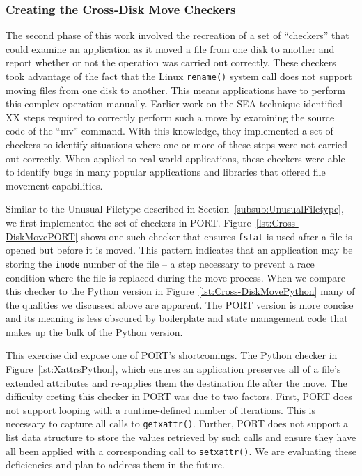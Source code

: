 \subsubsection{Creating the Cross-Disk Move Checkers}

The second phase of this work involved the recreation of a set of
``checkers'' that could examine an application as it moved a file from one
disk to another and report whether or not the operation was carried
out correctly.  These checkers took advantage of the fact that the Linux
{\tt rename()} system call does not support moving files from one disk to
another.  This means applications have to perform this complex
operation manually.  Earlier work on the SEA technique
identified XX steps required to
correctly perform such a move by examining the source code of the ``mv''
command.  With this knowledge, they
implemented a set of checkers to identify situations where one
or more of these steps were not carried out correctly.
When applied to real world applications,
these checkers were able to identify bugs
in many popular applications and libraries that offered file movement
capabilities.

Similar to the Unusual Filetype described in
Section~\ref{subsub:UnusualFiletype},
we first implemented the
set of checkers in PORT.  Figure~\ref{lst:Cross-DiskMovePORT} shows one
such checker that ensures {\tt fstat} is used after a file is opened but
before it is moved.  This pattern indicates that an application may be
storing the {\tt inode} number of the file -- a step necessary to prevent a race
condition where the file is replaced during the move process.  When
we compare this checker to the Python version in
Figure~\ref{lst:Cross-DiskMovePython} many of the qualities we discussed
above are apparent.  The PORT version is more concise and its meaning is
less obscured by boilerplate and state management code that makes up the
bulk of the Python version.

This exercise did expose one of PORT's shortcomings.
The Python checker in Figure~\ref{lst:XattrsPython},
which ensures an application
preserves all of a file's extended attributes and re-applies them the
destination file after the move.
The difficulty creting this checker
in PORT was due to two factors.
First, PORT does not support looping with a
runtime-defined number of iterations.  This is necessary to capture all
calls to {\tt getxattr()}.
Further, PORT does not support a list data structure to store the values
retrieved by such calls and ensure they have all been applied with a
corresponding call to {\tt setxattr()}.
We are evaluating these deficiencies and plan to address them in the
future.

